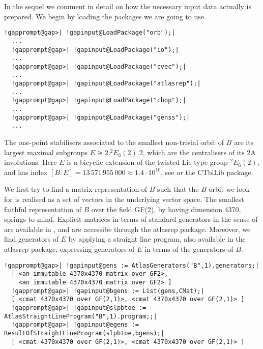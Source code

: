 \documentclass[a4paper,11pt]{report}
\begin{document}
{{ In the sequel we comment in detail on how the necessary input data actually is
prepared. We begin by loading the packages we are going to use.  
\begin{Verbatim}[commandchars=!@|,fontsize=\small,frame=single,label=Example]
  !gapprompt@gap>| !gapinput@LoadPackage("orb");|
  ...
  !gapprompt@gap>| !gapinput@LoadPackage("io");|
  ...
  !gapprompt@gap>| !gapinput@LoadPackage("cvec");|
  ...
  !gapprompt@gap>| !gapinput@LoadPackage("atlasrep");|
  ...
  !gapprompt@gap>| !gapinput@LoadPackage("chop");|
  ...
  !gapprompt@gap>| !gapinput@LoadPackage("genss");|
  ...  
\end{Verbatim}
 

 The one-point stabilisers associated to the smallest non-trivial orbit of $B$ are its largest maximal subgroups $E \cong 2.^2E_6(2).2$, which are the centralisers of its 2A involutions. Here $E$ is a bicyclic extension of the twisted Lie type group $^2E_6(2)$, and has index $[B\colon E]=13\,571\,955\,000 \approx 1.4 \cdot 10^{10}$, see \cite{CCN85} or the \textsf{CTblLib} package. 

 We first try to find a matrix representation of $B$ such that the $B$-orbit we look for is realised as a set of vectors in the underlying vector
space. The smallest faithful representation of $B$ over the field GF(2), by \cite{Jansen} having dimension 4370, springs to mind. Explicit matrices in terms of standard
generators in the sense of \cite{Wil96} are available in \cite{AGR}, and are accessibe through the \textsf{atlasrep} package. Moreover, we find generators of $E$ by applying a straight line program, also available in the \textsf{atlasrep} package, expressing generators of $E$ in terms of the generators of $B$. 
\begin{Verbatim}[commandchars=!@|,fontsize=\small,frame=single,label=Example]
  !gapprompt@gap>| !gapinput@gens := AtlasGenerators("B",1).generators;|
  [ <an immutable 4370x4370 matrix over GF2>, 
    <an immutable 4370x4370 matrix over GF2> ]
  !gapprompt@gap>| !gapinput@bgens := List(gens,CMat);|
  [ <cmat 4370x4370 over GF(2,1)>, <cmat 4370x4370 over GF(2,1)> ] 
  !gapprompt@gap>| !gapinput@slpbtoe := AtlasStraightLineProgram("B",1).program;;|
  !gapprompt@gap>| !gapinput@egens := ResultOfStraightLineProgram(slpbtoe,bgens);|
  [ <cmat 4370x4370 over GF(2,1)>, <cmat 4370x4370 over GF(2,1)> ] 
\end{Verbatim}
 

}}
\end{document}
